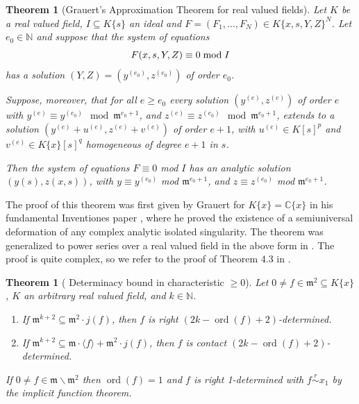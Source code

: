 \documentclass[11pt]{article}
\DeclareMathOperator{\ord}{ord}
\newtheorem{Theorem}[Definition]{Theorem}
\newcommand{\N}{{\mathbb N}}
\newcommand{\C}{{\mathbb C}}
\newcommand{\fm}{\mathfrak{m}}
\begin{document}
\begin{Theorem}[Grauert's Approximation Theorem for real valued fields]
\label{grauertapprox}
Let $K$ be a real valued field, $I \subseteq K\{s\}$ an ideal and  $F = (F_1, \ldots, F_N)  \in K\{x,s,Y,Z\}^N$.
Let $e_0 \in \N$ and suppose that the system of equations  {
$$F(x,s,Y,Z) \equiv 0 \; {\rm mod} \; I$$
has
a solution $(Y,Z)=(y^{(e_0)}, z^{(e_0)})$ of order $e_0$.}

 Suppose, moreover,
that for all $ e \ge e_0$ every solution 
$(y^{(e)},z^{(e)})$ of order $e$  with
$y^{(e)} \equiv y^{(e_0)} \mod
{\fm}^{e_0+1}$, 
and $z^{(e)} \equiv z^{(e_0)} \mod {\fm}^{e_0+1}$,
extends to a solution  $(y^{(e)} +
u^{(e)}, z^{(e)} + v^{(e)})$ of order $e+1$,
 with
$u^{(e)}\in K[s]^p$ and $v^{(e)} \in K\{x\}[s]^q$ homogeneous of
degree $e+1$ in $s$.

Then the system of equations $F \equiv 0$ mod $I$ has
an analytic solution $(y(s), z(x,s))$, with $y \equiv y^{(e_0)}$ mod
${\fm}^{e_0+1}$, and $z \equiv z^{(e_0)}$ mod ${\fm}^{e_0+1}$.
\end{Theorem} 

The proof of this theorem  was first given by Grauert for 
$K\{x\} = \C\{x\}$  in his fundamental Inventiones paper \cite{Gr72}, where he proved the existence of a semiuniversal deformation of any complex analytic isolated singularity. The theorem was generalized to power series over a real valued field in the above form in 
 \cite{GP25}. The proof is quite complex, so
 we refer to the proof of Theorem 4.3 in  \cite{GP25}.
  
   \begin{Theorem}[ {Determinacy bound in characteristic $\ge 0$}]\label{thm:finitedeterminacybound}
     Let $0\not=f\in\fm^2 \subseteq K\{x\}$, $K$ an arbitrary real valued field, and $k\in\N$.
     \begin{enumerate}
     \item If $\fm^{k+2}\subseteq\fm^2\cdot j(f)$, then $f$ is
       right $(2k-\ord(f)+2)$-determined. 
     \item If $\fm^{k+2}\subseteq\fm\cdot\langle f\rangle+\fm^2\cdot j(f)$, then $f$ is  contact $(2k-\ord(f)+2)$-determined. 
     \end{enumerate}     
 If $0\not=f\in \fm \smallsetminus \fm^2$ then $\ord(f) =1$ and 
 $f$ is right 1-determined with $f\overset{r }{\sim} x_1$ by the implicit function theorem.
   \end{Theorem}
   
\end{document}
